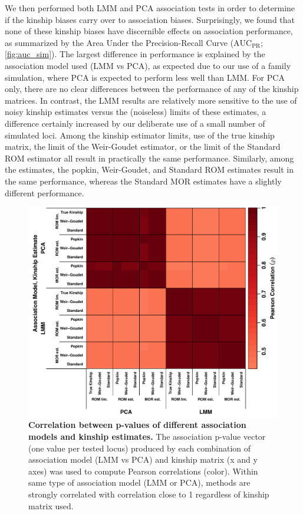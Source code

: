 \documentclass[11pt]{article}
\newcommand{\auc}{\text{AUC}_\text{PR}}
\begin{document}
We then performed both LMM and PCA association tests in order to determine if the kinship biases carry over to association biases.
Surprisingly, we found that none of these kinship biases have discernible effects on association performance, as summarized by the Area Under the Precision-Recall Curve ($\auc$; \cref{fig:auc_sim}).
The largest difference in performance is explained by the association model used (LMM vs PCA), as expected due to our use of a family simulation, where PCA is expected to perform less well than LMM.
For PCA only, there are no clear differences between the performance of any of the kinship matrices.
In contrast, the LMM results are relatively more sensitive to the use of noisy kinship estimates versus the (noiseless) limits of these estimates, a difference certainly increased by our deliberate use of a small number of simulated loci.
Among the kinship estimator limits, use of the true kinship matrix, the limit of the Weir-Goudet estimator, or the limit of the Standard ROM estimator all result in practically the same performance.
Similarly, among the estimates, the popkin, Weir-Goudet, and Standard ROM estimates result in the same performance, whereas the Standard MOR estimates have a slightly different performance.

\begin{figure}[bp!]
  \centering
  \includegraphics[width=\textwidth]{pvals_cor.pdf}
  \caption{
    {\bf Correlation between p-values of different association models and kinship estimates.}
    The association p-value vector (one value per tested locus) produced by each combination of association model (LMM vs PCA) and kinship matrix (x and y axes) was used to compute Pearson correlations (color).
    Within same type of association model (LMM or PCA), methods are strongly correlated with correlation close to 1 regardless of kinship matrix used.
    }
  \label{fig:pvals_cor_sim}
\end{figure}
\end{document}

